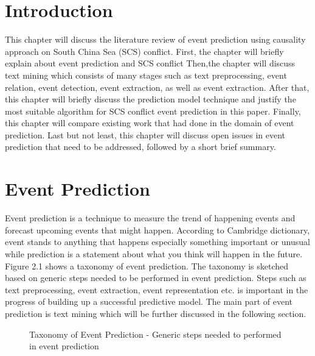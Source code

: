 \documentclass[twoside]{utmthesis}
\begin{document}
\section{Introduction}
This chapter will discuss the literature review of event prediction using causality approach on South China Sea (SCS) conflict. First, the chapter will briefly explain about event prediction and SCS conflict Then,the chapter will discuss text mining which consists of many stages such as text preprocessing, event relation, event detection, event extraction, as well as event extraction. After that, this chapter will briefly discuss the prediction model technique and justify the most suitable algorithm for SCS conflict event prediction in this paper. Finally, this chapter will compare existing work that had done in the domain of event prediction. Last but not least, this chapter will discuss  open issues in event prediction that need to be addressed, followed by a short brief summary.  


\section{Event Prediction}
Event prediction is a technique to measure the trend of happening events and forecast upcoming events that might happen. According to Cambridge dictionary, event stands to anything that happens especially something important or unusual while prediction is a statement about what you think will happen in the future. Figure 2.1 shows a taxonomy of event prediction. The taxonomy is sketched based on generic steps needed to be performed in event prediction. Steps such as text preprocessing, event extraction, event representation etc. is important in the progress of building up a successful predictive model. The main part of event prediction is text mining which will be further discussed in the following section.  

\begin{figure}[H]
\centering
{}
\caption{Taxonomy of Event Prediction - Generic steps needed to performed in event prediction}
\end{figure}  
\vspace{-1cm}
 
\end{document}
